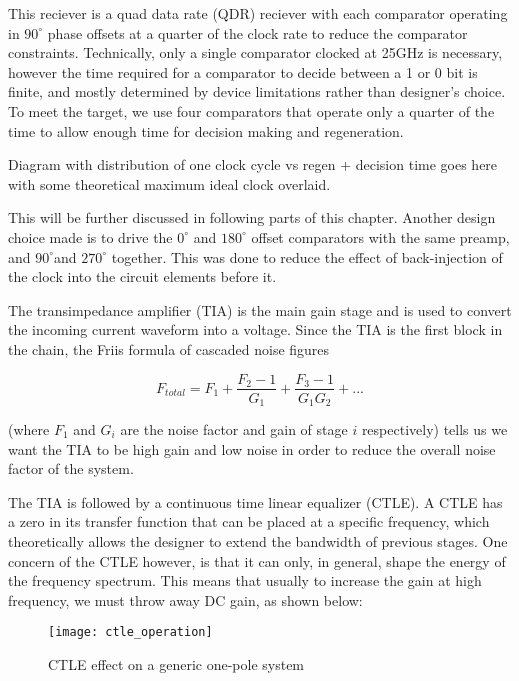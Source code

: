 This reciever is a quad data rate (QDR) reciever with each comparator operating in $90^\circ$ phase offsets at a quarter of the clock rate to reduce the comparator constraints. Technically, only a single comparator clocked at 25GHz is necessary, however the time required for a comparator to decide between a 1 or 0 bit is finite, and mostly determined by device limitations rather than designer's choice. To meet the target, we use four comparators that operate only a quarter of the time to allow enough time for decision making and regeneration.

\begin{center}
Diagram with distribution of one clock cycle vs regen + decision time goes here with some theoretical maximum ideal clock overlaid.
\end{center}

This will be further discussed in following parts of this chapter. Another design choice made is to drive the $0^\circ$ and $180^\circ$ offset comparators with the same preamp, and $90^\circ$and $270^\circ$ together. This was done to reduce the effect of back-injection of the clock into the circuit elements before it.

The transimpedance amplifier (TIA) is the main gain stage and is used to convert the incoming current waveform into a voltage. Since the TIA is the first block in the chain, the Friis formula of cascaded noise figures

\begin{equation}
\label{friis}
F_{total}=F_1+\frac{F_2-1}{G_1}+\frac{F_3-1}{G_1G_2}+...
\end{equation}

(where $F_1$ and $G_i$ are the noise factor and gain of stage $i$ respectively) tells us we want the TIA to be high gain and low noise in order to reduce the overall noise factor of the system.

The TIA is followed by a continuous time linear equalizer (CTLE). A CTLE has a zero in its transfer function that can be placed at a specific frequency, which theoretically allows the designer to extend the bandwidth of previous stages. One concern of the CTLE however, is that it can only, in general, shape the energy of the frequency spectrum. This means that usually to increase the gain at high frequency, we must throw away DC gain, as shown below:

\begin{figure}[h]
\centering
\texttt{[image: ctle\_operation]}
\caption{CTLE effect on a generic one-pole system}
\label{fig:CTLE Operation}
\end{figure}

